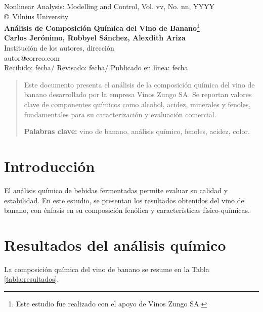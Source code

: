 \documentclass[a4paper, 10pt]{article}
\begin{document}
\begin{center}
Nonlinear Analysis: Modelling and Control, Vol. vv, No. nn, YYYY\\
\copyright\ Vilnius University\\[24pt]
\LARGE
\textbf{Análisis de Composición Química del Vino de Banano}\footnote{Este estudio fue realizado con el apoyo de Vinos Zungo SA.}\\[6pt]
\small
\textbf{Carlos Jerónimo, Robbyel Sánchez, Alexdith Ariza}\\[6pt]
Institución de los autores, dirección \\ autor@correo.com\\[6pt]
Recibido: fecha\quad/\quad
Revisado: fecha\quad/\quad
Publicado en línea: fecha
\end{center}

\begin{abstract}
Este documento presenta el análisis de la composición química del vino de banano desarrollado por la empresa Vinos Zungo SA. Se reportan valores clave de componentes químicos como alcohol, acidez, minerales y fenoles, fundamentales para su caracterización y evaluación comercial.\vskip 2mm

\textbf{Palabras clave:} vino de banano, análisis químico, fenoles, acidez, color.
\end{abstract}

\section{Introducción}
El análisis químico de bebidas fermentadas permite evaluar su calidad y estabilidad. En este estudio, se presentan los resultados obtenidos del vino de banano, con énfasis en su composición fenólica y características físico-químicas.

\section{Resultados del análisis químico}
La composición química del vino de banano se resume en la Tabla \ref{tabla:resultados}.
\end{document}
